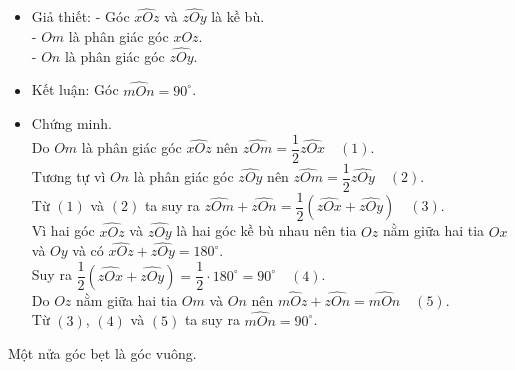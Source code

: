 \begin{vd}%
	\loigiai
	{\begin{itemize}
			\item Giả thiết: - Góc $\widehat{xOz}$ và $\widehat{zOy}$ là  kề bù.\\
			- $Om$ là phân giác góc $\widehat{xOz}$.\\
			- $On$ là phân giác góc $\widehat{zOy}$.
			\item Kết luận: Góc $\widehat{mOn} = 90^{\circ}$.
			\item  Chứng minh.\\
		Do $Om$ là phân giác góc $\widehat{xOz}$ nên $\widehat{zOm} = \dfrac{1}{2}\widehat{zOx} \quad (1)$.\\
			Tương tự  vì $On$ là phân giác góc $\widehat{zOy}$ nên $\widehat{zOm} = \dfrac{1}{2}\widehat{zOy} \quad (2)$.\\
			Từ $(1)$ và $(2)$ ta suy ra $\widehat{zOm}  + \widehat{zOn}= \dfrac{1}{2}\left(\widehat{zOx} + \widehat{zOy}\right)\quad (3)$.\\
		Vì hai góc $\widehat{xOz}$ và  $\widehat{zOy}$ là hai góc kề bù nhau nên tia $Oz$ nằm giữa hai tia $Ox$ và $Oy$ và có $\widehat{xOz} + \widehat{zOy} = 180^{\circ}$.\\
		Suy ra $\dfrac{1}{2}\left(\widehat{zOx} + \widehat{zOy}\right) = \dfrac{1}{2}\cdot 180^{\circ} = 90^{\circ}\quad (4)$.\\
		Do $Oz$ nằm giữa hai tia $Om$ và $On$ nên $\widehat{mOz} + \widehat{zOn} = \widehat{mOn}\quad (5)$.\\
		Từ $(3)$, $(4)$ và $(5)$ ta suy ra $\widehat{mOn} = 90^{\circ}$.
		\end{itemize}
	}
\end{vd}
\begin{note} 
Một nửa góc bẹt là góc vuông.
\end{note}


